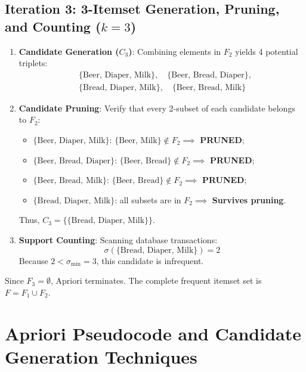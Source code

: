 \subsection{Iteration 3: 3-Itemset Generation, Pruning, and Counting ($k=3$)}
\begin{enumerate}
    \item \textbf{Candidate Generation ($C_3$)}: Combining elements in $F_2$ yields 4 potential triplets:
    \begin{equation}
    \begin{aligned}
    & \{\text{Beer, Diaper, Milk}\}, \quad \{\text{Beer, Bread, Diaper}\}, \\
    & \{\text{Bread, Diaper, Milk}\}, \quad \{\text{Beer, Bread, Milk}\}
    \end{aligned}
    \end{equation}
    \item \textbf{Candidate Pruning}: Verify that every 2-subset of each candidate belongs to $F_2$:
    \begin{itemize}[noitemsep]
        \item $\{\text{Beer, Diaper, Milk}\}$: $\{\text{Beer, Milk}\} \notin F_2 \implies$ \textbf{PRUNED};
        \item $\{\text{Beer, Bread, Diaper}\}$: $\{\text{Beer, Bread}\} \notin F_2 \implies$ \textbf{PRUNED};
        \item $\{\text{Beer, Bread, Milk}\}$: $\{\text{Beer, Bread}\} \notin F_2 \implies$ \textbf{PRUNED};
        \item $\{\text{Bread, Diaper, Milk}\}$: all subsets are in $F_2 \implies$ \textbf{Survives pruning}.
    \end{itemize}
    Thus, $C_3 = \{\{\text{Bread, Diaper, Milk}\}\}$.
    \item \textbf{Support Counting}: Scanning database transactions:
    \begin{equation}
    \sigma(\{\text{Bread, Diaper, Milk}\}) = 2
    \end{equation}
    Because $2 < \sigma_{\min} = 3$, this candidate is infrequent.
\end{enumerate}

Since $F_3 = \emptyset$, Apriori terminates. The complete frequent itemset set is $F = F_1 \cup F_2$.

\section{Apriori Pseudocode and Candidate Generation Techniques}
\label{sec:dm-candidate-generation-methods}

